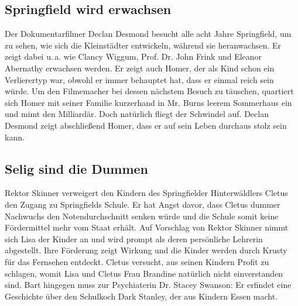\subsection{Springfield wird erwachsen}\label{JABF07}
Der Dokumentarfilmer Declan Desmond besucht alle acht Jahre Springfield, um zu sehen, wie sich die Kleinstädter entwickeln, während sie heranwachsen. Er zeigt dabei u.\,a. wie Clancy Wiggum, Prof. Dr. John Frink und Eleanor Abernathy erwachsen werden. Er zeigt auch Homer, der als Kind schon ein Verlierertyp war, obwohl er immer behauptet hat, dass er einmal reich sein würde. Um den Filmemacher bei dessen nächstem Besuch zu täuschen, quartiert sich Homer mit seiner Familie kurzerhand in Mr. Burns leerem Sommerhaus ein und mimt den Milliardär. Doch natürlich fliegt der Schwindel auf. Declan Desmond zeigt abschließend Homer, dass er auf sein Leben durchaus stolz sein kann.


\subsection{Selig sind die Dummen}
Rektor Skinner verweigert den Kindern des Springfielder Hinterwäldlers Cletus den Zugang zu Springfields Schule. Er hat Angst davor, dass Cletus dummer Nachwuchs den Notendurchschnitt senken würde und die Schule somit keine Fördermittel mehr vom Staat erhält. Auf Vorschlag von Rektor Skinner nimmt sich Lisa der Kinder an und wird prompt als deren persönliche Lehrerin abgestellt. Ihre Förderung zeigt Wirkung und die Kinder werden durch Krusty für das Fernsehen entdeckt. Cletus versucht, aus seinen Kindern Profit zu schlagen, womit Lisa und Cletus Frau Brandine natürlich nicht einverstanden sind. Bart hingegen muss zur Psychiaterin Dr. Stacey Swanson: Er erfindet eine Geschichte über den Schulkoch Dark Stanley, der aus Kindern Essen macht.

